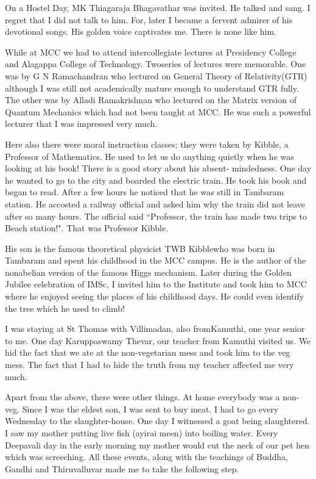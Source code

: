 On a Hostel Day, MK Thiagaraja Bhagavathar was invited. He talked and 
sang. I regret that I did not talk to him. For, later I became a fervent 
admirer of his devotional songs. His golden voice captivates me. There 
is none like him.
\eject

While at MCC we had to attend intercollegiate lectures at Presidency 
College and Alagappa College of Technology. Two\break series of lectures were 
memorable. One was by G N Rama\-chandran who lectured on General Theory of 
Relativity(GTR) although I was still not academically mature enough to 
understand GTR fully. The other was by Alladi Ramakrishnan who lectured 
on the Matrix version of Quantum Mechanics which had not been taught at 
MCC. He was such a powerful lecturer that I was impre\-ssed very much.
\smallskip

Here also there were moral instruction classes; they were taken by 
Kibble, a Professor of Mathematics. He used to let us do anything 
quietly when he was looking at his book! There is a good story about his 
absent- mindedness. One day he wanted to go to the city and boarded the 
electric train. He took his book and began to read. After a few hours he 
noticed that he was still in Tambaram station. He accosted a railway 
official and asked him why the train did not leave after so many hours. 
The official said ``Professor, the train has made two trips to Beach 
station!". That was Professor Kibble.
\smallskip
 
His son is the famous theoretical physicist TWB Kibble\break	who was born in 
Tambaram and spent his childhood in the MCC campus. He is the author of 
the nonabelian version of the famous Higgs mechanism. Later during the 
Golden Jubilee celebration of IMSc, I invited him to the Institute and 
took him to MCC where he enjoyed seeing the places of his childhood 
days. He could even identify the tree which he used to climb!
\smallskip
  
I was staying at St Thomas with Villimadan, also from\break Kamuthi, one year 
senior to me. One day Karuppaswamy Thevar, our teacher from Kamuthi 
visited us. We hid the fact that we ate at the non-vegetarian mess and 
took him to the veg mess. The fact that I had to hide the truth from my 
teacher affected me very much.
\smallskip

Apart from the above, there were other things. At home every\-body was a 
non-veg. Since I was the eldest son, I was sent to buy meat. I had to go 
every Wednesday to the slaughter-house. One day I witnessed a goat being 
slaughtered. I saw my mother putting live fish (ayirai meen) into 
boiling water. Every Deepavali day in the early morning my mother would 
cut the neck of our pet hen which was screeching. All these events, 
along with the teachings of Buddha, Gandhi and Thiruvalluvar made me to 
take the following step.
\smallskip

